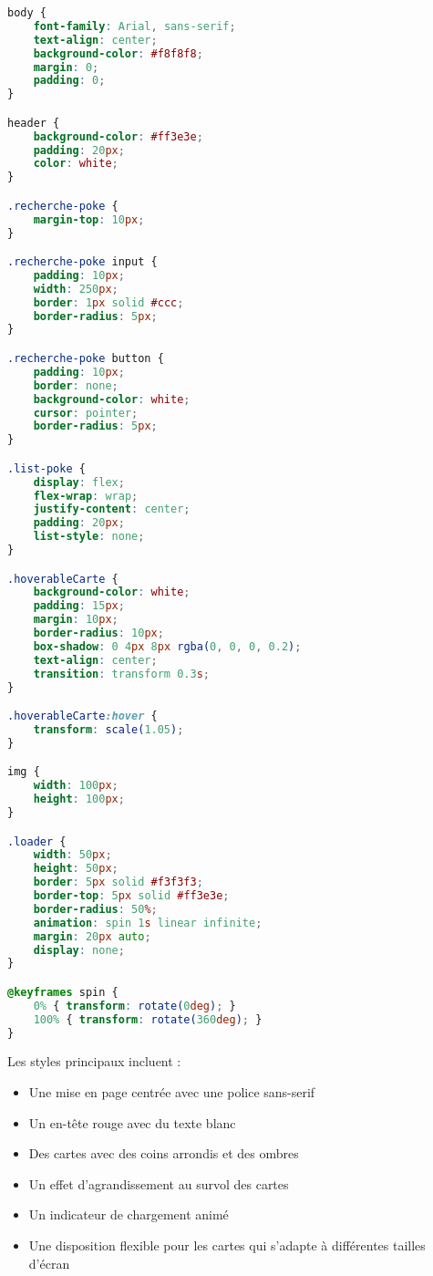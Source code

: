 \documentclass{article}
\begin{document}
\begin{lstlisting}[language=CSS]
body {
    font-family: Arial, sans-serif;
    text-align: center;
    background-color: #f8f8f8;
    margin: 0;
    padding: 0;
}

header {
    background-color: #ff3e3e;
    padding: 20px;
    color: white;
}

.recherche-poke {
    margin-top: 10px;
}

.recherche-poke input {
    padding: 10px;
    width: 250px;
    border: 1px solid #ccc;
    border-radius: 5px;
}

.recherche-poke button {
    padding: 10px;
    border: none;
    background-color: white;
    cursor: pointer;
    border-radius: 5px;
}

.list-poke {
    display: flex;
    flex-wrap: wrap;
    justify-content: center;
    padding: 20px;
    list-style: none;
}

.hoverableCarte {
    background-color: white;
    padding: 15px;
    margin: 10px;
    border-radius: 10px;
    box-shadow: 0 4px 8px rgba(0, 0, 0, 0.2);
    text-align: center;
    transition: transform 0.3s;
}

.hoverableCarte:hover {
    transform: scale(1.05);
}

img {
    width: 100px;
    height: 100px;
}

.loader {
    width: 50px;
    height: 50px;
    border: 5px solid #f3f3f3;
    border-top: 5px solid #ff3e3e;
    border-radius: 50%;
    animation: spin 1s linear infinite;
    margin: 20px auto;
    display: none;
}

@keyframes spin {
    0% { transform: rotate(0deg); }
    100% { transform: rotate(360deg); }
}
\end{lstlisting}

Les styles principaux incluent :
\begin{itemize}
    \item Une mise en page centrée avec une police sans-serif
    \item Un en-tête rouge avec du texte blanc
    \item Des cartes avec des coins arrondis et des ombres
    \item Un effet d'agrandissement au survol des cartes
    \item Un indicateur de chargement animé
    \item Une disposition flexible pour les cartes qui s'adapte à différentes tailles d'écran
\end{itemize}
\end{document}
